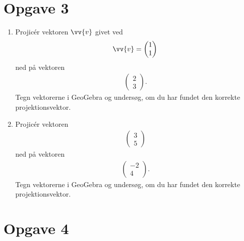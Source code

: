 \section*{Opgave 3}
\begin{enumerate}[label=\roman*)]
	\item Projicér vektoren $\vv{v}$ givet ved
	\begin{align*}
		\vv{v} = 
		\begin{pmatrix}
			1 \\ 1
		\end{pmatrix}
	\end{align*} ned på vektoren
	\begin{align*}
		\begin{pmatrix}
			2 \\ 3
		\end{pmatrix}.
	\end{align*}
	Tegn vektorerne i GeoGebra og undersøg, om du har fundet den korrekte projektionsvektor. 
	\item Projicér vektoren 
	\begin{align*}
		\begin{pmatrix}
			3\\5
		\end{pmatrix}
	\end{align*}
	ned på vektoren 
	\begin{align*}
		\begin{pmatrix}
			-2 \\ 4
		\end{pmatrix}.
	\end{align*}
	Tegn vektorerne i GeoGebra og undersøg, om du har fundet den korrekte projektionsvektor.
\end{enumerate}


\section*{Opgave 4}

